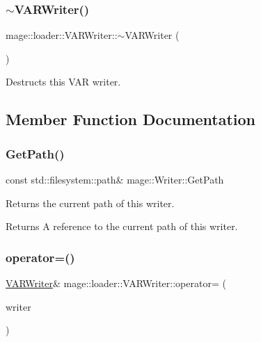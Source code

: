 \subsubsection{\texorpdfstring{$\sim$\+V\+A\+R\+Writer()}{~VARWriter()}}
{\footnotesize\ttfamily mage\+::loader\+::\+V\+A\+R\+Writer\+::$\sim$\+V\+A\+R\+Writer (\begin{DoxyParamCaption}{ }\end{DoxyParamCaption})\hspace{0.3cm}{\ttfamily [default]}}

Destructs this V\+AR writer. 

\subsection{Member Function Documentation}
\mbox{\label{classmage_1_1loader_1_1_v_a_r_writer_ab023ae8174132f233c6e1fa4d3a2a1c8}} 
\subsubsection{\texorpdfstring{Get\+Path()}{GetPath()}}
{\footnotesize\ttfamily const std\+::filesystem\+::path\& mage\+::\+Writer\+::\+Get\+Path\hspace{0.3cm}{\ttfamily [noexcept]}}

Returns the current path of this writer.

\begin{DoxyReturn}{Returns}
A reference to the current path of this writer. 
\end{DoxyReturn}
\mbox{\label{classmage_1_1loader_1_1_v_a_r_writer_a6ffe21455dfc82f8d829d9cabe59ba53}} 
\subsubsection{\texorpdfstring{operator=()}{operator=()}\hspace{0.1cm}{\footnotesize\ttfamily [1/2]}}
{\footnotesize\ttfamily \mbox{\hyperlink{classmage_1_1loader_1_1_v_a_r_writer}{V\+A\+R\+Writer}}\& mage\+::loader\+::\+V\+A\+R\+Writer\+::operator= (\begin{DoxyParamCaption}\item[{const \mbox{\hyperlink{classmage_1_1loader_1_1_v_a_r_writer}{V\+A\+R\+Writer}} \&}]{writer }\end{DoxyParamCaption})\hspace{0.3cm}{\ttfamily [delete]}}

